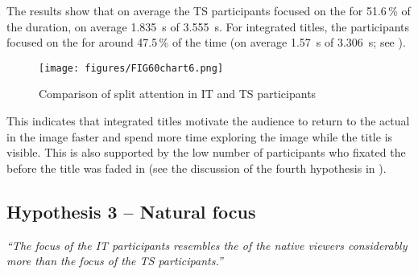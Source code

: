 

\bigskip
The results show that on average the TS participants focused on the  for 51.6\,\% of the  duration, on average 1.835~s of 3.555~s. For integrated titles, the participants focused on the  for around 47.5\,\% of the time (on average 1.57~s of 3.306~s; see ).

\begin{figure}
\texttt{[image: figures/FIG60chart6.png]}
\caption{Comparison of split attention in IT and TS participants}
\label{fig:FIG60chart6}
\end{figure}

This indicates that integrated titles motivate the audience to return to the actual  in the image faster and spend more time exploring the image while the title is visible. This is also supported by the low number of participants who fixated the  before the title was faded in (see the discussion of the fourth hypothesis in ).

\subsection{Hypothesis 3 – Natural focus}\label{sec:8.1.3}
\textit{“The focus of the IT participants resembles the  of the native viewers considerably more than the focus of the TS participants.”}
\bigskip

